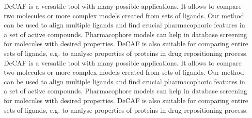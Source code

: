 \documentclass[a0paper,portrait]{baposter}
\begin{document}
\begin{poster}
{DeCAF is a versatile tool with many possible applications.
It allows to compare two molecules or more complex models created from sets of ligands.
Our method can be used to align multiple ligands and find crucial pharmacophoric features in a set of active compounds.
Pharmacophore models can help in database screening for molecules with desired properties.
DeCAF is also suitable for comparing entire sets of ligands, e.g. to analyse properties of proteins in drug repositioning process. DeCAF is a versatile tool with many possible applications.
It allows to compare two molecules or more complex models created from sets of ligands.
Our method can be used to align multiple ligands and find crucial pharmacophoric features in a set of active compounds.
Pharmacophore models can help in database screening for molecules with desired properties.
DeCAF is also suitable for comparing entire sets of ligands, e.g. to analyse properties of proteins in drug repositioning process.



}


\end{poster}
\end{document}
